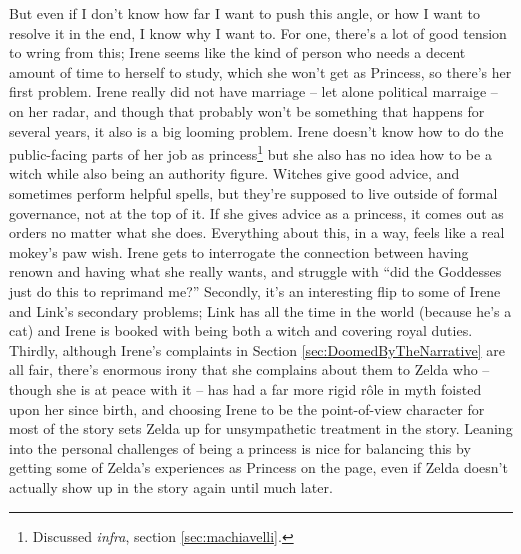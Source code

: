   But even if I don't know how far I want to push this angle, or how I want to resolve it in the end, I know why I want to. For one, there's a lot of good tension to wring from this; Irene seems like the kind of person who needs a decent amount of time to herself to study, which she won't get as Princess, so there's her first problem. Irene really did not have marriage -- let alone political marraige -- on her radar, and though that probably won't be something that happens for several years, it also is a big looming problem. Irene doesn't know how to do the public-facing parts of her job as princess\footnote{Discussed \textit{infra}, section \ref{sec:machiavelli}.} but she also has no idea how to be a witch while also being an authority figure. Witches give good advice, and sometimes perform helpful spells, but they're supposed to live outside of formal governance, not at the top of it. If she gives advice as a princess, it comes out as orders no matter what she does. Everything about this, in a way, feels like a real mokey's paw wish. Irene gets to interrogate the connection between having renown and having what she really wants, and struggle with ``did the Goddesses just do this to reprimand me?'' Secondly, it's an interesting flip to some of Irene and Link's secondary problems; Link has all the time in the world (because he's a cat) and Irene is booked with being both a witch and covering royal duties. Thirdly, although Irene's complaints in Section \ref{sec:DoomedByTheNarrative} are all fair, there's enormous irony that she complains about them to Zelda who -- though she is at peace with it -- has had a far more rigid r\^ole in myth foisted upon her since birth, and choosing Irene to be the point-of-view character for most of the story sets Zelda up for unsympathetic treatment in the story. Leaning into the personal challenges of being a princess is nice for balancing this by getting some of Zelda's experiences as Princess on the page, even if Zelda doesn't actually show up in the story again until much later. 

